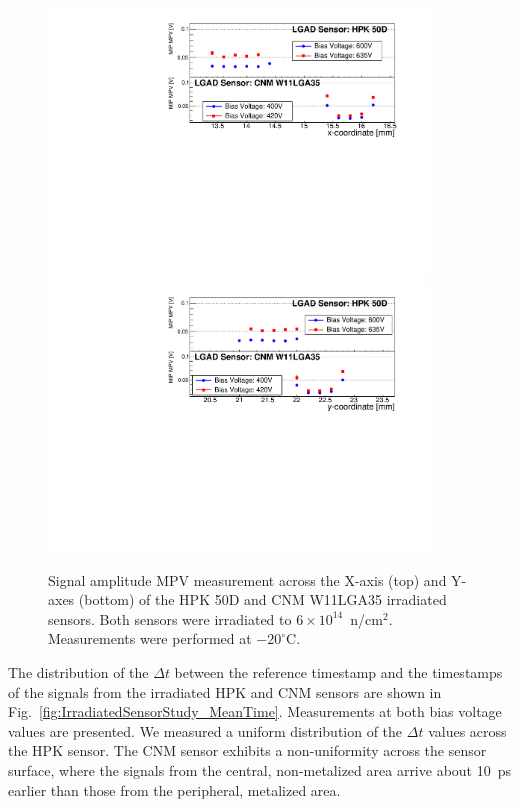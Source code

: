 \documentclass[preprint,1p]{elsarticle}
\begin{document}
\begin{figure}[htbp] 
\centering
\includegraphics[width=0.90\textwidth]{figs/USCSBoard_HPK50DIrradiated-CNMW11LGA35_Run936-961/IrradiatedSensorStudy_MPV_vs_X.pdf} 
\includegraphics[width=0.90\textwidth]{figs/USCSBoard_HPK50DIrradiated-CNMW11LGA35_Run936-961/IrradiatedSensorStudy_MPV_vs_Y.pdf} 
\caption{Signal amplitude MPV measurement across the X-axis (top) and Y-axes (bottom) of the HPK 50D and CNM W11LGA35 irradiated sensors. Both sensors were irradiated to $6\times 10^{14}$~n/cm$^2$. Measurements were performed at $-20^{\circ}$C.} 
\label{fig:IrradiatedSensorStudy_MPV} 
\end{figure}

The distribution of the $\Delta{t}$ between the reference timestamp and the
timestamps of the signals from the irradiated HPK and CNM sensors are shown in
Fig.~\ref{fig:IrradiatedSensorStudy_MeanTime}. Measurements at both bias voltage
values are presented. We measured a uniform distribution of the $\Delta{t}$
values across the HPK sensor. The CNM sensor exhibits a non-uniformity across
the sensor surface, where the signals from the central, non-metalized area
arrive about 10~ps earlier than those from the peripheral, metalized area. 
\end{document}
